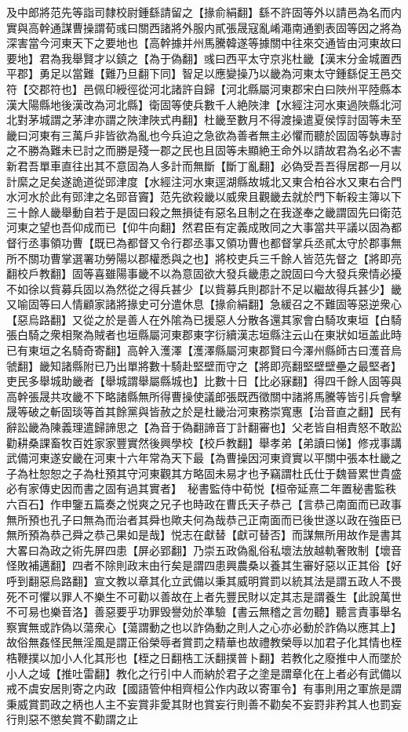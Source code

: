 及中郎將范先等詣司隸校尉鍾繇請留之【掾俞絹翻】繇不許固等外以請邑為名而内實與高幹通謀曹操謂荀彧曰關西諸將外服内貳張晟寇亂崤澠南通劉表固等因之將為深害當今河東天下之要地也【高幹據并州馬騰韓遂等據關中往來交通皆由河東故曰要地】君為我舉賢才以鎮之【為于偽翻】彧曰西平太守京兆杜畿【漢末分金城置西平郡】勇足以當難【難乃旦翻下同】智足以應變操乃以畿為河東太守鍾繇促王邑交符【交郡符也】邑佩印綬徑從河北諸許自歸【河北縣屬河東郡宋白曰陜州平陸縣本漢大陽縣地後漢改為河北縣】衛固等使兵數千人絶陜津【水經注河水東過陜縣北河北對茅城謂之茅津亦謂之陜津陜式冉翻】杜畿至數月不得渡操遣夏侯惇討固等未至畿曰河東有三萬戶非皆欲為亂也今兵迫之急欲為善者無主必懼而聽於固固等埶專討之不勝為難未已討之而勝是殘一郡之民也且固等未顯絶王命外以請故君為名必不害新君吾單車直往出其不意固為人多計而無斷【斷丁亂翻】必偽受吾吾得居郡一月以計縻之足矣遂詭道從郖津度【水經注河水東逕湖縣故城北又東合柏谷水又東右合門水河水於此有郖津之名郖音竇】范先欲殺畿以威衆且觀畿去就於門下斬殺主簿以下三十餘人畿舉動自若于是固曰殺之無損徒有惡名且制之在我遂奉之畿謂固先曰衛范河東之望也吾仰成而已【仰牛向翻】然君臣有定義成敗同之大事當共平議以固為都督行丞事領功曹【既已為都督又令行郡丞事又領功曹也都督掌兵丞貳太守於郡事無所不關功曹掌選署功勞陽以郡權悉與之也】將校吏兵三千餘人皆范先督之【將即亮翻校戶教翻】固等喜雖陽事畿不以為意固欲大發兵畿患之說固曰今大發兵衆情必擾不如徐以貲募兵固以為然從之得兵甚少【以貲募兵則郡計不足以繼故得兵甚少】畿又喻固等曰人情顧家諸將掾史可分遣休息【掾俞絹翻】急緩召之不難固等惡逆衆心【惡烏路翻】又從之於是善人在外隂為已援惡人分散各還其家會白騎攻東垣【白騎張白騎之衆相聚為賊者也垣縣屬河東郡東字衍續漢志垣縣注云山在東狀如垣盖此時已有東垣之名騎奇寄翻】高幹入濩澤【濩澤縣屬河東郡賢曰今澤州縣師古曰濩音烏虢翻】畿知諸縣附已乃出單將數十騎赴堅壁而守之【將即亮翻堅壁壁壘之最堅者】吏民多舉城助畿者【舉城謂舉屬縣城也】比數十日【比必寐翻】得四千餘人固等與高幹張晟共攻畿不下略諸縣無所得曹操使議郎張既西徵關中諸將馬騰等皆引兵會擊晟等破之斬固琰等首其餘黨與皆赦之於是杜畿治河東務崇寬惠【治音直之翻】民有辭訟畿為陳義理遣歸諦思之【為音于偽翻諦音丁計翻審也】父老皆自相責怒不敢訟勸耕桑課畜牧百姓家家豐實然後興學校【校戶教翻】舉孝弟【弟讀曰悌】修戎事講武備河東遂安畿在河東十六年常為天下最【為曹操因河東資實以平關中張本杜畿之子為杜恕恕之子為杜預其守河東觀其方略固未易才也予竊謂杜氏仕于魏晉累世貴盛必有家傳史因而書之固有過其實者】　秘書監侍中荀悦【桓帝延熹二年置秘書監秩六百石】作申鑒五篇奏之悦爽之兄子也時政在曹氏天子恭己【言恭己南面而已政事無所預也孔子曰無為而治者其舜也歟夫何為哉恭己正南面而已後世遂以政在強臣已無所預為恭己舜之恭己果如是哉】悦志在獻替【獻可替否】而謀無所用故作是書其大畧曰為政之術先屏四患【屏必郢翻】乃崇五政偽亂俗私壞法放越軌奢敗制【壞音怪敗補邁翻】四者不除則政末由行矣是謂四患興農桑以養其生審好惡以正其俗【好呼到翻惡烏路翻】宣文教以章其化立武備以秉其威明賞罰以統其法是謂五政人不畏死不可懼以罪人不樂生不可勸以善故在上者先豐民財以定其志是謂養生【此說萬世不可易也樂音洛】善惡要乎功罪毁譽効於凖驗【書云無稽之言勿聽】聽言責事舉名察實無或詐偽以蕩衆心【蕩謂動之也以詐偽動之則人之心亦必動於詐偽以應其上】故俗無姦怪民無淫風是謂正俗榮辱者賞罰之精華也故禮教榮辱以加君子化其情也桎梏鞭撲以加小人化其形也【桎之日翻梏工沃翻撲普卜翻】若教化之廢推中人而墜於小人之域【推吐雷翻】教化之行引中人而納於君子之塗是謂章化在上者必有武備以戒不虞安居則寄之内政【國語管仲相齊桓公作内政以寄軍令】有事則用之軍旅是謂秉威賞罰政之柄也人主不妄賞非愛其財也賞妄行則善不勸矣不妄罸非矜其人也罰妄行則惡不懲矣賞不勸謂之止